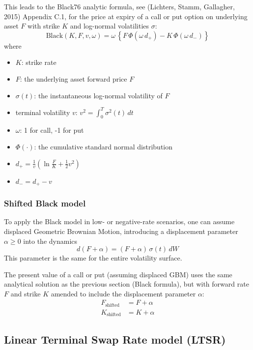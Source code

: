 This leads to the Black76 analytic formula, see (Lichters, Stamm, Gallagher, 2015) 
Appendix C.1, for the price at expiry of a call or put option on underlying asset $F$ 
with strike $K$ and log-normal volatilities $\sigma$: 
$$
\mbox{Black}(K,F ,v,\omega)=\omega\,\left\{F\,\Phi(\omega\, d_+) - K\,\Phi(\omega \, d_-)\right\}
$$
where
\begin{itemize}
\item $K$: strike rate
\item $F$: the underlying asset forward price $F$
\item $\sigma(t)$: the instantaneous log-normal volatility of $F$
\item  terminal volatility $v$: $\displaystyle v^2=\int_0^T\sigma^2(t)\,dt$ 
\item $\omega$: 1 for call, -1 for put
\item $\Phi(\cdot)$: the cumulative standard normal distribution
\item $\displaystyle d_+ = \frac{1}{v}\left(\ln\frac{F}{K}+ \frac{1}{2}v^2\right)$
\item $d_-= d_+ - v$
\end{itemize}

\subsubsection*{Shifted Black model}

To apply the Black model in low- or negative-rate scenarios, one can assume displaced 
Geometric Brownian Motion, introducing a displacement parameter $\alpha\geq 0$ into 
the dynamics
$$
d(F + \alpha) = (F + \alpha)\,\sigma(t)\,dW
$$
This parameter is the same for the entire volatility surface.

The present value of a call or put (assuming displaced GBM) uses 
the same analytical solution as the previous section (Black formula), but with 
forward rate $F$ and strike $K$ amended to include the displacement parameter 
$\alpha$:
\begin{align*}
F_{\mbox{shifted}} &= F + \alpha \\
K_{\mbox{shifted}} &= K + \alpha
\end{align*}

\subsection{Linear Terminal Swap Rate model (LTSR)}
\label{models:LTSR}

